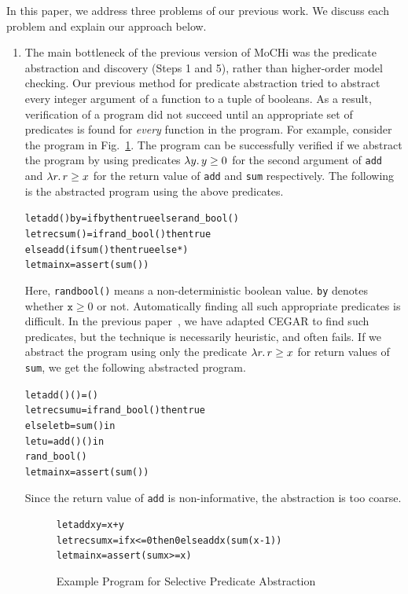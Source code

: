 In this paper, we address three problems of our previous work.
We discuss each problem and explain our approach below.

\begin{enumerate}
\item The main bottleneck of the previous version of MoCHi was the
      predicate abstraction and discovery (Steps 1 and 5), rather than
      higher-order model checking. Our previous method for predicate
      abstraction tried to abstract every integer argument of a function
      to a tuple of booleans. As a result, verification of a program did
      not succeed until an appropriate set of predicates is found for
      \emph{every} function in the program.  For example, consider the
      program in Fig.~\ref{fig:sum}.  The program can be successfully
      verified if we abstract the program by using predicates
      $\lambda{y}.\,{y \geq 0}$ for the second argument of \texttt{add} and
      $\lambda{r}.\,{r \geq x}$ for the return value of \texttt{add} and
      \texttt{sum} respectively.  The following is the
      abstracted program using the above predicates.
\begin{alltt}
let add () by = if by then true else rand_bool()
let rec sum () = if rand_bool() then true
                else add (if sum () then true else *)
let main x = assert (sum ())
\end{alltt}
      Here, \texttt{rand\us{}bool()} means a non-deterministic boolean
      value.  \texttt{by} denotes whether $\mathtt{x} \geq 0$ or not.
      Automatically finding all such appropriate predicates is
      difficult.  In the previous paper~\cite{KobayashiPLDI2011}, we
      have adapted CEGAR to find such predicates, but the technique is
      necessarily heuristic, and often fails.  If we abstract the
      program using only the predicate $\lambda{r}.\,{r \geq x}$ for return
      values of \texttt{sum}, we get the following abstracted program.
\begin{alltt}
let add () () = ()
let rec sum u = if rand_bool() then true
                else let b = sum () in
                     let u = add () () in
                       rand_bool()
let main x = assert (sum ())
\end{alltt}
      Since the return value of \texttt{add} is non-informative, the
      abstraction is too coarse.

\begin{figure}[t]
\begin{alltt}
let add x y = x + y
let rec sum x = if x <= 0 then 0 else add x (sum (x-1))
let main x = assert (sum x >= x)
\end{alltt}
\caption{Example Program for Selective Predicate Abstraction}
\label{fig:sum}
\end{figure}


\end{enumerate}
